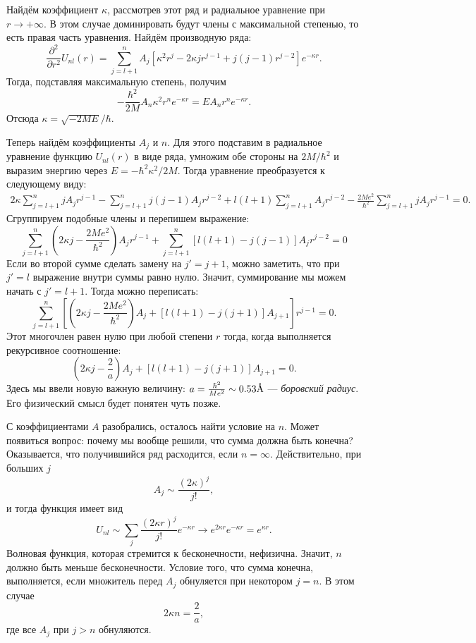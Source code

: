 Найдём коэффициент $\kappa$, рассмотрев этот ряд и радиальное уравнение при $r
  \rightarrow +\infty$. В этом случае доминировать будут члены с максимальной
степенью, то есть правая часть уравнения. Найдём производную ряда:
\[
  \frac{\partial^2}{\partial r^2} U_{nl}(r) =  \sum\limits_{j=l+1}^{n} A_j[\kappa^2r^j - 2\kappa jr^{j-1} + j(j-1)r^{j-2}]e^{-\kappa r}.
\]
Тогда, подставляя максимальную степень, получим
\[
  -\frac{\hbar^2}{2M}A_n\kappa^2r^n e^{-\kappa r} = E A_n r^n e^{-\kappa r}.
\]
Отсюда $\kappa = \sqrt{-2ME}/\hbar$.

Теперь найдём коэффициенты $A_j$ и $n$. Для этого подставим в радиальное
уравнение функцию $U_{nl}(r)$ в виде ряда, умножим обе стороны на $2M/\hbar^2$
и выразим энергию через $E = -\hbar^2\kappa^2/2M$. Тогда уравнение
преобразуется к следующему виду:
\begin{align*}
  2\kappa\sum\limits_{j = l+1}^n jA_j r^{j-1} - \sum\limits_{j = l+1}^n j(j-1)A_j r^{j-2} + l(l+1)\sum\limits_{j = l+1}^n A_j r^{j-2} - \frac{2Me^2}{\hbar^2}\sum\limits_{j = l+1}^n jA_j r^{j-1} =0.
\end{align*}
Сгруппируем подобные члены и перепишем выражение:
\[
  \sum\limits_{j = l+1}^n\left(2\kappa j - \frac{2Me^2}{\hbar^2}\right)A_j r^{j-1} + \sum\limits_{j = l+1}^n [l(l+1) - j(j-1)] A_j r^{j-2} =0
\]
Если во второй сумме сделать замену на $j' = j + 1$, можно заметить, что при
$j'=l$ выражение внутри суммы равно нулю. Значит, суммирование мы можем начать
с $j'= l+ 1$. Тогда можно переписать:
\[
  \sum\limits_{j = l+1}^n\left[\left(2\kappa j - \frac{2Me^2}{\hbar^2}\right)A_j+ [l(l+1) - j(j+1)] A_{j+1} \right]r^{j-1} = 0.
\]
Этот многочлен равен нулю при любой степени $r$ тогда, когда выполняется
рекурсивное соотношение:
\[
  \left(2\kappa j - \frac{2}{a}\right)A_j+ [l(l+1) - j(j+1)] A_{j+1} = 0.
\]
Здесь мы ввели новую важную величину: $a = \frac{\hbar^2}{Me^2} \sim 0.53
  \text{\r{A}}$ --- \textit{боровский радиус}. Его физический смысл будет понятен
чуть позже.

С коэффициентами $A$ разобрались, осталось найти условие на $n$. Может
появиться вопрос: почему мы вообще решили, что сумма должна быть конечна?
Оказывается, что получившийся ряд расходится, если $n=\infty$. Действительно,
при больших $j$
\[
  A_j \sim \frac{(2\kappa)^j}{j!},
\]
и тогда функция имеет вид
\[
  U_{nl} \sim \sum\limits_j\frac{(2\kappa r)^j}{j!}e^{-\kappa r} \rightarrow e^{2\kappa r}e^{-\kappa r} = e^{\kappa r}.
\]
Волновая функция, которая стремится к бесконечности, нефизична. Значит, $n$
должно быть меньше бесконечности. Условие того, что сумма конечна, выполняется,
если множитель перед $A_j$ обнуляется при некотором $j = n$. В этом случае
\[
  2\kappa n = \frac{2}{a},
\]
где все $A_j$ при $j > n$ обнуляются.

